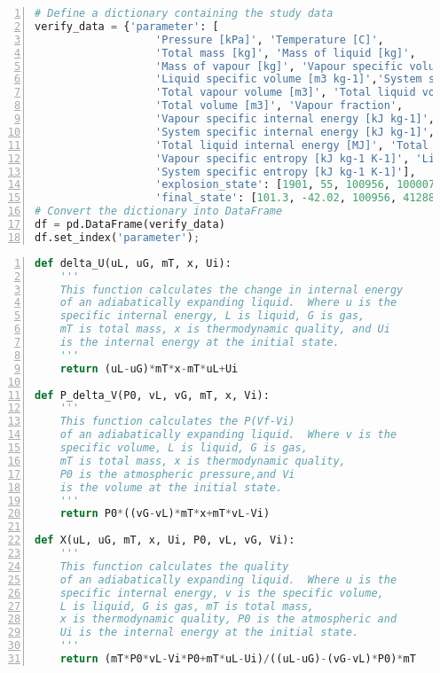 \documentclass[10pt,parskip=half,
toc=sectionentrywithdots,
bibliography=totocnumbered,
captions=tableheading,numbers=noendperiod]{scrartcl}
\begin{document}
\begin{lstlisting}[language=Python,numbers=left,xleftmargin=20pt,xrightmargin=5pt,belowskip=5pt,aboveskip=5pt]
# Define a dictionary containing the study data
verify_data = {'parameter': [
                   'Pressure [kPa]', 'Temperature [C]',
                   'Total mass [kg]', 'Mass of liquid [kg]',
                   'Mass of vapour [kg]', 'Vapour specific volume [m3 kg-1]',
                   'Liquid specific volume [m3 kg-1]','System specific volume[m3 kg-1]',
                   'Total vapour volume [m3]', 'Total liquid volume [m3]',
                   'Total volume [m3]', 'Vapour fraction',
                   'Vapour specific internal energy [kJ kg-1]', 'Liquid specific internal energy [kJ kg-1]',
                   'System specific internal energy [kJ kg-1]', 'Total vapour internal energy [MJ]',
                   'Total liquid internal energy [MJ]', 'Total internal energy [MJ]',
                   'Vapour specific entropy [kJ kg-1 K-1]', 'Liquid specific entropy [kJ kg-1 K-1]',
                   'System specific entropy [kJ kg-1 K-1]'],
                   'explosion_state': [1901, 55, 100956, 100007, 949.1,0.02293, 0.002282, 0.002476, 21.8, 228.2, 250, 0.009401, 582, 349.2, 351.4, 560, 34920, 35480, 2.33, 1.501, 1.508],
                   'final_state': [101.3, -42.02, 100956, 41288, 59668, 0.4136, 0.001721, 0.2452, 24681, 71, 24752, 0.591, 483.7, 100.1, 326.8, 28860, 4133, 32990, 2.448, 0.6068, 1.695]}
# Convert the dictionary into DataFrame
df = pd.DataFrame(verify_data)
df.set_index('parameter');

\end{lstlisting}

\begin{lstlisting}[language=Python,numbers=left,xleftmargin=20pt,xrightmargin=5pt,belowskip=5pt,aboveskip=5pt]
def delta_U(uL, uG, mT, x, Ui):
    '''
    This function calculates the change in internal energy
    of an adiabatically expanding liquid.  Where u is the
    specific internal energy, L is liquid, G is gas,
    mT is total mass, x is thermodynamic quality, and Ui
    is the internal energy at the initial state.
    '''
    return (uL-uG)*mT*x-mT*uL+Ui

def P_delta_V(P0, vL, vG, mT, x, Vi):
    '''
    This function calculates the P(Vf-Vi)
    of an adiabatically expanding liquid.  Where v is the
    specific volume, L is liquid, G is gas,
    mT is total mass, x is thermodynamic quality,
    P0 is the atmospheric pressure,and Vi
    is the volume at the initial state.
    '''
    return P0*((vG-vL)*mT*x+mT*vL-Vi)

def X(uL, uG, mT, x, Ui, P0, vL, vG, Vi):
    '''
    This function calculates the quality
    of an adiabatically expanding liquid.  Where u is the
    specific internal energy, v is the specific volume,
    L is liquid, G is gas, mT is total mass,
    x is thermodynamic quality, P0 is the atmospheric and
    Ui is the internal energy at the initial state.
    '''
    return (mT*P0*vL-Vi*P0+mT*uL-Ui)/((uL-uG)-(vG-vL)*P0)*mT
\end{lstlisting}
\end{document}
